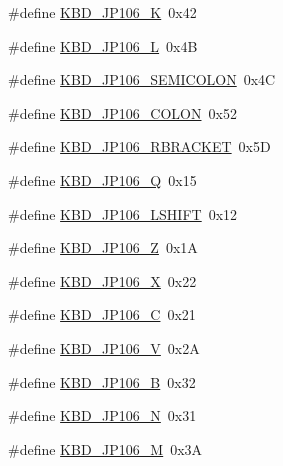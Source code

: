 \begin{DoxyCompactItemize}
\item 
\#define \hyperlink{kbd__jp106_8h_a929672f0cbf9aafba2498184e0429f4b_a929672f0cbf9aafba2498184e0429f4b}{K\+B\+D\+\_\+\+J\+P106\+\_\+\+K}~0x42
\item 
\#define \hyperlink{kbd__jp106_8h_a2edd35d4e16ae8ac3c56f1a1a7e8ff31_a2edd35d4e16ae8ac3c56f1a1a7e8ff31}{K\+B\+D\+\_\+\+J\+P106\+\_\+\+L}~0x4\+B
\item 
\#define \hyperlink{kbd__jp106_8h_a557235183958b6fb7e2d9efc4d902a55_a557235183958b6fb7e2d9efc4d902a55}{K\+B\+D\+\_\+\+J\+P106\+\_\+\+S\+E\+M\+I\+C\+O\+L\+O\+N}~0x4\+C
\item 
\#define \hyperlink{kbd__jp106_8h_a65d5198ef93cba23fc498c20857bc65d_a65d5198ef93cba23fc498c20857bc65d}{K\+B\+D\+\_\+\+J\+P106\+\_\+\+C\+O\+L\+O\+N}~0x52
\item 
\#define \hyperlink{kbd__jp106_8h_aa5895bd010c0fa28c834744dea86f8fc_aa5895bd010c0fa28c834744dea86f8fc}{K\+B\+D\+\_\+\+J\+P106\+\_\+\+R\+B\+R\+A\+C\+K\+E\+T}~0x5\+D
\item 
\#define \hyperlink{kbd__jp106_8h_a6ddac9f757f187d45626571f90c4a14b_a6ddac9f757f187d45626571f90c4a14b}{K\+B\+D\+\_\+\+J\+P106\+\_\+\+Q}~0x15
\item 
\#define \hyperlink{kbd__jp106_8h_ad23e4472cdac4c764a02b1deff70f303_ad23e4472cdac4c764a02b1deff70f303}{K\+B\+D\+\_\+\+J\+P106\+\_\+\+L\+S\+H\+I\+F\+T}~0x12
\item 
\#define \hyperlink{kbd__jp106_8h_a8ffbfcef66d177be1f1f3d2d8f29ba51_a8ffbfcef66d177be1f1f3d2d8f29ba51}{K\+B\+D\+\_\+\+J\+P106\+\_\+\+Z}~0x1\+A
\item 
\#define \hyperlink{kbd__jp106_8h_ad8d950ccf158438d3f73ec8560641105_ad8d950ccf158438d3f73ec8560641105}{K\+B\+D\+\_\+\+J\+P106\+\_\+\+X}~0x22
\item 
\#define \hyperlink{kbd__jp106_8h_aad1269f32c0957271459340f61048ae3_aad1269f32c0957271459340f61048ae3}{K\+B\+D\+\_\+\+J\+P106\+\_\+\+C}~0x21
\item 
\#define \hyperlink{kbd__jp106_8h_aa10eb355206ff1e429ec5de35e433b02_aa10eb355206ff1e429ec5de35e433b02}{K\+B\+D\+\_\+\+J\+P106\+\_\+\+V}~0x2\+A
\item 
\#define \hyperlink{kbd__jp106_8h_a2e898a636be5ac8be069674f68647dd7_a2e898a636be5ac8be069674f68647dd7}{K\+B\+D\+\_\+\+J\+P106\+\_\+\+B}~0x32
\item 
\#define \hyperlink{kbd__jp106_8h_ae2def8f333a84e98ba0ab3cdb2145ae0_ae2def8f333a84e98ba0ab3cdb2145ae0}{K\+B\+D\+\_\+\+J\+P106\+\_\+\+N}~0x31
\item 
\#define \hyperlink{kbd__jp106_8h_a5b25c464c55f9807c627603fba07c1c0_a5b25c464c55f9807c627603fba07c1c0}{K\+B\+D\+\_\+\+J\+P106\+\_\+\+M}~0x3\+A

\end{DoxyCompactItemize}

